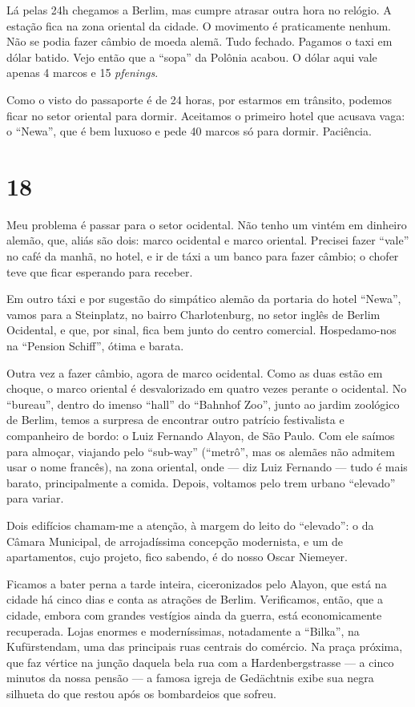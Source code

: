 Lá pelas 24h chegamos a Berlim, mas cumpre atrasar outra hora no relógio. A estação fica na zona oriental da cidade. O movimento é praticamente nenhum. Não se podia fazer câmbio de moeda alemã. Tudo fechado. Pagamos o taxi em dólar batido. Vejo então que a ``sopa'' da Polônia acabou. O dólar aqui vale apenas 4 marcos e 15 \textit{pfenings}.

Como o visto do passaporte é de 24 horas, por estarmos em trânsito, podemos ficar no setor oriental para dormir. Aceitamos o primeiro hotel que acusava vaga: o ``Newa'', que é bem luxuoso e pede 40 marcos só para dormir. Paciência.

\section*{18 \adfflatleafright {}}
Meu problema é passar para o setor ocidental. Não tenho um vintém em dinheiro alemão, que, aliás são dois: marco ocidental e marco oriental. Precisei fazer ``vale'' no café da manhã, no hotel, e ir de táxi a um banco para fazer câmbio; o chofer teve que ficar esperando para receber.

Em outro táxi e por sugestão do simpático alemão da portaria do hotel ``Newa'', vamos para a Steinplatz, no bairro Charlotenburg, no setor inglês de Berlim Ocidental, e que, por sinal, fica bem junto do centro comercial. Hospedamo-nos na ``Pension Schiff'', ótima e barata.

Outra vez a fazer câmbio, agora de marco ocidental. Como as duas estão em choque, o marco oriental é desvalorizado em quatro vezes perante o ocidental. No ``bureau'', dentro do imenso ``hall'' do ``Bahnhof Zoo'', junto ao jardim zoológico de Berlim, temos a surpresa de encontrar outro patrício festivalista e companheiro de bordo: o Luiz Fernando Alayon, de São Paulo. Com ele saímos para almoçar, viajando pelo ``sub-way'' (``metrô'', mas os alemães não admitem usar o nome francês), na zona oriental, onde --- diz Luiz Fernando --- tudo é mais barato, principalmente a comida. Depois, voltamos pelo trem urbano ``elevado'' para variar.

Dois edifícios chamam-me a atenção, à margem do leito do ``elevado'': o da Câmara Municipal, de arrojadíssima concepção modernista, e um de apartamentos, cujo projeto, fico sabendo, é do nosso Oscar Niemeyer.

Ficamos a bater perna a tarde inteira, ciceronizados pelo Alayon, que está na cidade há cinco dias e conta as atrações de Berlim. Verificamos, então, que a cidade, embora com grandes vestígios ainda da guerra, está economicamente recuperada. Lojas enormes e moderníssimas, notadamente a ``Bilka'', na Kufürstendam, uma das principais ruas centrais do comércio. Na praça próxima, que faz vértice na junção daquela bela rua com a Hardenbergstrasse --- a cinco minutos da nossa pensão --- a famosa igreja de Gedächtnis exibe sua negra silhueta do que restou após os bombardeios que sofreu.

